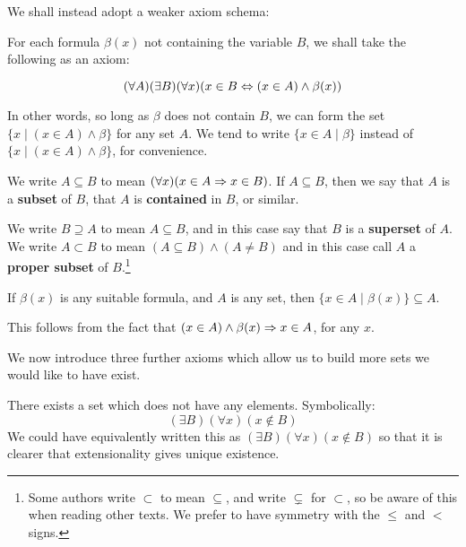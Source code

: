 We shall instead adopt a weaker axiom schema: 

\begin{axm} 
\label{Axiom: Separation}
For each formula $\beta(x)$ not containing the variable $B$, we shall take the following as an axiom:

$$(\forall A)(\exists B)(\forall x)(x\in B \Leftrightarrow (x\in A)\land\beta(x))$$

In other words, so long as $\beta$ does not contain $B$, we can form the set $\{x\mid (x\in A)\land\beta\}$ for any set $A$. We tend to write $\{x\in A\mid \beta\}$ instead of $\{x\mid (x\in A)\land\beta\}$, for convenience.
\end{axm}

\begin{defn}
\label{Defn: Subsets}
We write $A\subseteq B$ to mean $(\forall x)(x\in A\Rightarrow x\in B)$. If $A\subseteq B$, then we say that $A$ is a \textbf{subset} of $B$, that $A$ is \textbf{contained} in $B$, or similar. 

We write $B\supseteq A$ to mean $A\subseteq B$, and in this case say that $B$ is a \textbf{superset} of $A$. We write $A\subset B$ to mean $(A\subseteq B) \land (A\neq B)$ and in this case call $A$ a \textbf{proper subset} of $B$.\footnote{Some authors write $\subset$ to mean $\subseteq$, and write $\subsetneq$ for $\subset$, so be aware of this when reading other texts. We prefer to have symmetry with the $\leq$ and $<$ signs.}
\end{defn}

\begin{thm}
\label{Thm: Separation makes subsets} 
If $\beta(x)$ is any suitable formula, and $A$ is any set, then $\{x\in A\mid \beta(x)\}\subseteq A$. 
\end{thm}

\begin{prf}
This follows from the fact that $(x \in A)\land \beta(x)\Rightarrow x\in A$, for any $x$. 
\end{prf}

We now introduce three further axioms which allow us to build more sets we would like to have exist. 

\begin{axm}
\label{Axiom: Empty Set} 
There exists a set which does not have any elements. Symbolically: $$(\exists B)(\forall x)(x\notin B)$$ 
We could have equivalently written this as $(\exists B)(\forall x)(x\notin B)$ so that it is clearer that extensionality gives unique existence. 
\end{axm} 

